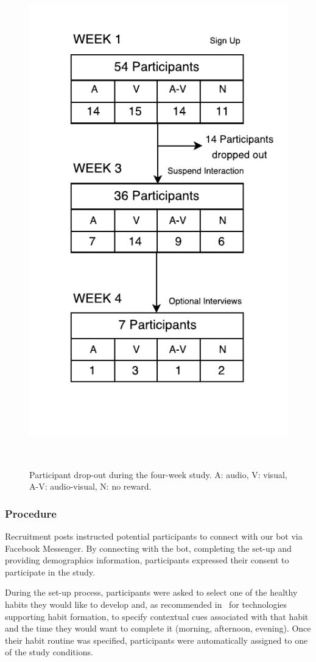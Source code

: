 \documentclass{scaffold/sigchi}
\begin{document}
\begin{figure}
  \centering
  \includegraphics[width=0.7\columnwidth]{figures/study-flow.pdf}
  \caption{Participant drop-out during the four-week study. A: audio, V: visual, A-V: audio-visual, N: no reward.}~\label{fig:study_dropout}
\end{figure}

\subsubsection{Procedure}
Recruitment posts instructed potential participants to connect with our bot via Facebook Messenger. By connecting with the bot, completing the set-up and providing demographics information, participants expressed their consent to participate in the study.

During the set-up process, participants were asked to select one of the healthy habits they would like to develop and, as recommended in~\cite{article_dont_forget_your_pill} for technologies supporting habit formation, to specify contextual cues associated with that habit and the time they would want to complete it (morning, afternoon, evening). Once their habit routine was specified, participants were automatically assigned to one of the study conditions. 
\end{document}

